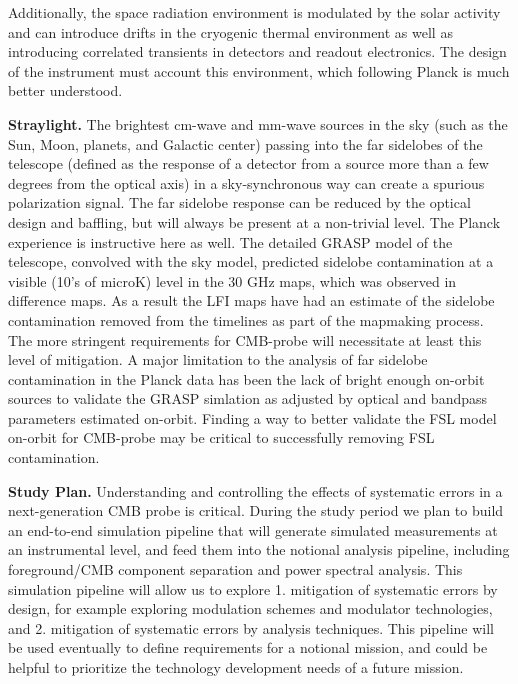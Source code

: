Additionally, the space radiation environment is modulated by the solar activity and
can introduce drifts in the cryogenic thermal environment as well as
introducing correlated transients in detectors and readout
electronics.  The design of the instrument must account this
environment, which following Planck is much better understood.

\textbf{Straylight.}   The brightest cm-wave and mm-wave sources in
the sky (such as the Sun, Moon, planets, and Galactic center) passing
into the far sidelobes of the telescope (defined as the response of a
detector from a source more than a few degrees from the optical axis)
in a sky-synchronous way can create a spurious polarization signal.
The far sidelobe response can be reduced by the optical design and baffling, but will always be present at a non-trivial level.  The Planck experience is instructive here as well.  The detailed GRASP model of the telescope, convolved with the sky model, predicted sidelobe contamination at a visible (10's of microK) level in the 30 GHz maps, which was observed in difference maps.  As a result the LFI maps have had an estimate of the sidelobe contamination removed from the timelines as part of the mapmaking process. The more stringent requirements for CMB-probe will necessitate at least this level of mitigation.  A major limitation to the analysis of far sidelobe contamination in the Planck data has been the lack of bright enough on-orbit sources to validate the GRASP simlation as adjusted by optical and bandpass parameters estimated on-orbit. Finding a way to better validate the FSL model on-orbit for CMB-probe may be critical to successfully removing FSL contamination.

\textbf{Study Plan.}  Understanding and controlling the effects of systematic errors in a next-generation CMB probe is critical.  During the study period we plan to build an end-to-end simulation pipeline that will generate simulated measurements at an instrumental level, and feed them into the notional analysis pipeline, including foreground/CMB component separation and power spectral analysis.  This simulation pipeline will allow us to explore 1. mitigation of systematic errors by design, for example exploring modulation schemes and modulator technologies, and 2. mitigation of systematic errors by analysis techniques.  This pipeline will be used eventually to define requirements for a notional mission, and could be helpful to prioritize the technology development needs of a future mission.


